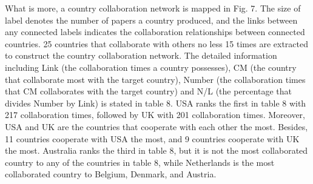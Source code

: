 \documentclass[11pt,a4paper]{elsarticle} %
\begin{document}
\begin{table}
\centering
\caption{The information about the top ten most cited countries}
\end{table}

What is more, a country collaboration network is mapped in Fig. 7. The
size of label denotes the number of papers a country produced, and the
links between any connected labels indicates the collaboration
relationships between connected countries. 25 countries that collaborate
with others no less 15 times are extracted to construct the country
collaboration network. The detailed information including Link (the
collaboration times a country possesses), CM (the country that
collaborate most with the target country), Number (the collaboration
times that CM collaborates with the target country) and N/L (the
percentage that divides Number by Link) is stated in table 8. USA ranks
the first in table 8 with 217 collaboration times, followed by UK with
201 collaboration times. Moreover, USA and UK are the countries that
cooperate with each other the most. Besides, 11 countries cooperate with
USA the most, and 9 countries cooperate with UK the most. Australia
ranks the third in table 8, but it is not the most collaborated country
to any of the countries in table 8, while Netherlands is the most
collaborated country to Belgium, Denmark, and Austria.
\end{document}
